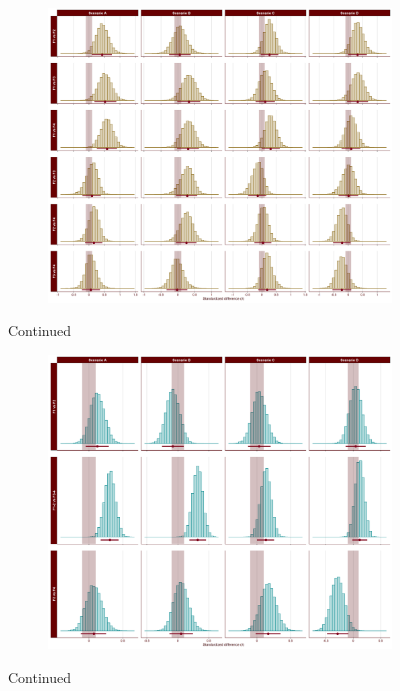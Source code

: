 \documentclass[
  english,
  man]{apa6}
\begin{document}
\begin{appendix}
\medskip

\begin{figure}[ht]\ContinuedFloat
\centering
\begin{subfigure}{1\textwidth}
\includegraphics[width=\linewidth]{Figures/SD2_proportion_scenario_comparisons_C.png}
\label{fig:proportion-scenario-comparisons-C}
\end{subfigure}
\caption[]{Continued}
\end{figure}

\medskip

\begin{figure}[ht]\ContinuedFloat
\centering
\begin{subfigure}{1\textwidth}
\includegraphics[width=\linewidth]{Figures/SD2_proportion_scenario_comparisons_D.png}
\label{fig:proportion-scenario-comparisons-D}
\end{subfigure}
\caption[]{Continued}
\label{fig:proportion-scenario-comparisons}
\end{figure}


\end{appendix}
\end{document}
